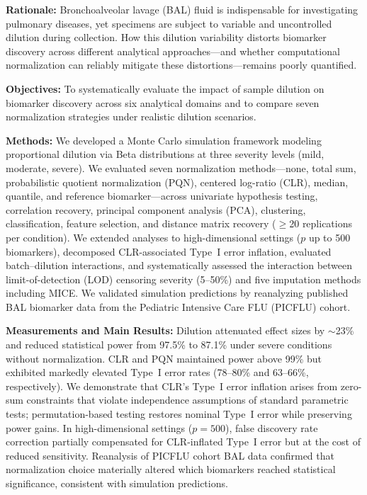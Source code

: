 \documentclass[12pt]{article}
\begin{document}
\textbf{Rationale:} Bronchoalveolar lavage (BAL) fluid is indispensable for investigating pulmonary diseases, yet specimens are subject to variable and uncontrolled dilution during collection. How this dilution variability distorts biomarker discovery across different analytical approaches---and whether computational normalization can reliably mitigate these distortions---remains poorly quantified.

\textbf{Objectives:} To systematically evaluate the impact of sample dilution on biomarker discovery across six analytical domains and to compare seven normalization strategies under realistic dilution scenarios.

\textbf{Methods:} We developed a Monte Carlo simulation framework modeling proportional dilution via Beta distributions at three severity levels (mild, moderate, severe). We evaluated seven normalization methods---none, total sum, probabilistic quotient normalization (PQN), centered log-ratio (CLR), median, quantile, and reference biomarker---across univariate hypothesis testing, correlation recovery, principal component analysis (PCA), clustering, classification, feature selection, and distance matrix recovery ($\geq$20 replications per condition). We extended analyses to high-dimensional settings ($p$ up to 500 biomarkers), decomposed CLR-associated Type~I error inflation, evaluated batch--dilution interactions, and systematically assessed the interaction between limit-of-detection (LOD) censoring severity (5--50\%) and five imputation methods including MICE. We validated simulation predictions by reanalyzing published BAL biomarker data from the Pediatric Intensive Care FLU (PICFLU) cohort.

\textbf{Measurements and Main Results:} Dilution attenuated effect sizes by $\sim$23\% and reduced statistical power from 97.5\% to 87.1\% under severe conditions without normalization. CLR and PQN maintained power above 99\% but exhibited markedly elevated Type~I error rates (78--80\% and 63--66\%, respectively). We demonstrate that CLR's Type~I error inflation arises from zero-sum constraints that violate independence assumptions of standard parametric tests; permutation-based testing restores nominal Type~I error while preserving power gains. In high-dimensional settings ($p=500$), false discovery rate correction partially compensated for CLR-inflated Type~I error but at the cost of reduced sensitivity. Reanalysis of PICFLU cohort BAL data confirmed that normalization choice materially altered which biomarkers reached statistical significance, consistent with simulation predictions.
\end{document}
